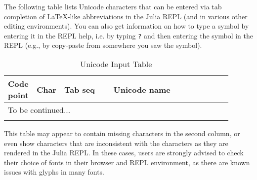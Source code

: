 \documentclass[UTF8, a4paper, oneside]{book}
\begin{document}
The following table lists Unicode characters that can be entered via tab completion of LaTeX-like abbreviations in the Julia REPL (and in various other editing environments).  You can also get information on how to type a symbol by entering it in the REPL help, i.e. by typing \texttt{?} and then entering the symbol in the REPL (e.g., by copy-paste from somewhere you saw the symbol).


\begin{longtable}{p{0.1\linewidth}p{0.05\linewidth}p{0.22\linewidth}p{0.53\linewidth}}
  \caption{Unicode Input Table} \\
  \toprule
  Code point & Char & Tab seq & Unicode name \\
  \hline \endhead
  \multicolumn{4}{l}{To be continued...} \\ 
  \midrule \endfoot
  \bottomrule \endlastfoot

  
  
  \bottomrule
\end{longtable}

This table may appear to contain missing characters in the second column, or even show characters that are inconsistent with the characters as they are rendered in the Julia REPL. In these cases, users are strongly advised to check their choice of fonts in their browser and REPL environment, as there are known issues with glyphs in many fonts.
\end{document}
